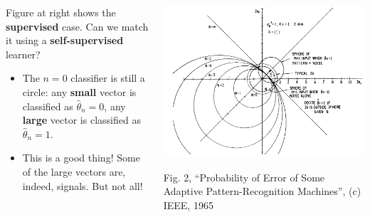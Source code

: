 \documentclass{beamer}
\begin{document}
\begin{frame}
  \begin{columns}
    \begin{column}{0.4\textwidth}
      
      Figure at right shows the {\bf supervised} case.  Can we match it
      using a {\bf self-supervised} learner?
      \begin{itemize}
      \item The $n=0$ classifier is still a circle: any {\bf small}
        vector is classified as $\hat\theta_n=0$, any {\bf large}
        vector is classified as $\hat\theta_n=1$.
      \item This is a good thing!  Some of the large vectors are,
        indeed, signals.  But not all!
      \end{itemize}
    \end{column}
    \begin{column}{0.6\textwidth}
      \begin{center}
        \includegraphics[width=\textwidth]{figs/scudder1965fig2.png}

        \begin{tiny}
          Fig. 2, ``Probability of Error of Some Adaptive
          Pattern-Recognition Machines'', (c) IEEE, 1965
        \end{tiny}
      \end{center}
    \end{column}
  \end{columns}
\end{frame}
\end{document}
